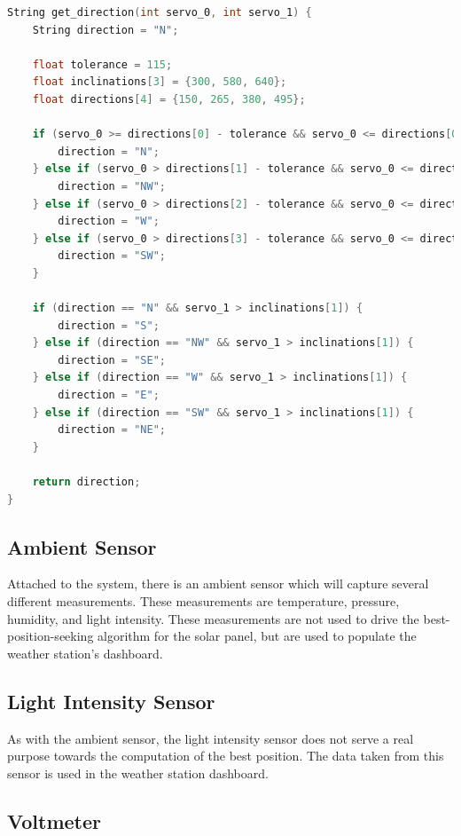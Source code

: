 \begin{lstlisting}[style=mystyle,language=C,caption={The \texttt{get\_direction} function keeps track of the 2 rotation axis and computes the direction.}]
String get_direction(int servo_0, int servo_1) {
    String direction = "N";

    float tolerance = 115;
    float inclinations[3] = {300, 580, 640};
    float directions[4] = {150, 265, 380, 495};

    if (servo_0 >= directions[0] - tolerance && servo_0 <= directions[0] + tolerance) {
        direction = "N";
    } else if (servo_0 > directions[1] - tolerance && servo_0 <= directions[1] + tolerance) {
        direction = "NW";
    } else if (servo_0 > directions[2] - tolerance && servo_0 <= directions[2] + tolerance) {
        direction = "W";
    } else if (servo_0 > directions[3] - tolerance && servo_0 <= directions[3] + tolerance) {
        direction = "SW";
    }

    if (direction == "N" && servo_1 > inclinations[1]) {
        direction = "S";
    } else if (direction == "NW" && servo_1 > inclinations[1]) {
        direction = "SE";
    } else if (direction == "W" && servo_1 > inclinations[1]) {
        direction = "E";
    } else if (direction == "SW" && servo_1 > inclinations[1]) {
        direction = "NE";
    }

    return direction;
}
\end{lstlisting}

\subsection*{Ambient Sensor}
Attached to the system, there is an ambient sensor which will capture several
different measurements. These measurements are temperature, pressure, humidity,
and light intensity. These measurements are not used to drive the
best-position-seeking algorithm for the solar panel, but are used to populate
the weather station's dashboard.

\subsection*{Light Intensity Sensor}
As with the ambient sensor, the light intensity sensor does not serve a real
purpose towards the computation of the best position. The data taken from this
sensor is used in the weather station dashboard.

\subsection*{Voltmeter}

